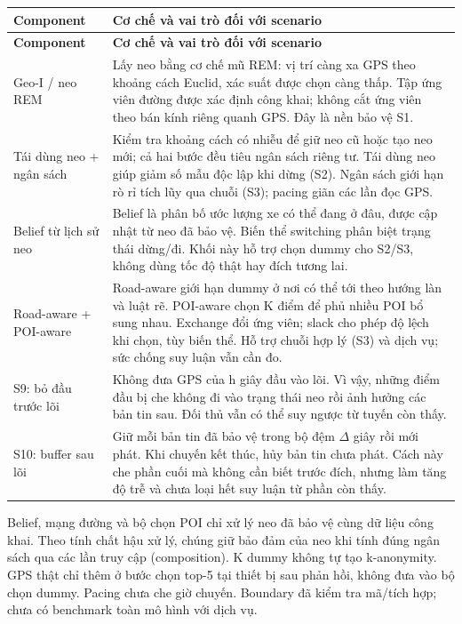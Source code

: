 \documentclass[10pt,a4paper]{article}
\begin{document}
\begingroup\small
\begin{longtable}{@{}P{4.105cm}P{12.814cm}@{}}
\toprule
\textbf{Component} & \textbf{Cơ chế và vai trò đối với scenario}\\\midrule
\endfirsthead
\toprule
\textbf{Component} & \textbf{Cơ chế và vai trò đối với scenario}\\\midrule
\endhead
\bottomrule\endfoot
Geo-I / neo REM & Lấy neo bằng cơ chế mũ REM: vị trí càng xa GPS theo khoảng cách Euclid, xác suất được chọn càng thấp. Tập ứng viên đường được xác định công khai; không cắt ứng viên theo bán kính riêng quanh GPS. Đây là nền bảo vệ S1.\\
\addlinespace[3pt]
Tái dùng neo + ngân sách & Kiểm tra khoảng cách có nhiễu để giữ neo cũ hoặc tạo neo mới; cả hai bước đều tiêu ngân sách riêng tư. Tái dùng neo giúp giảm số mẫu độc lập khi dừng (S2). Ngân sách giới hạn rò rỉ tích lũy qua chuỗi (S3); pacing giãn các lần đọc GPS.\\
\addlinespace[3pt]
Belief từ lịch sử neo & Belief là phân bố ước lượng xe có thể đang ở đâu, được cập nhật từ neo đã bảo vệ. Biến thể switching phân biệt trạng thái dừng/đi. Khối này hỗ trợ chọn dummy cho S2/S3, không dùng tốc độ thật hay đích tương lai.\\
\addlinespace[3pt]
Road-aware + POI-aware & Road-aware giới hạn dummy ở nơi có thể tới theo hướng làn và luật rẽ. POI-aware chọn K điểm để phủ nhiều POI bổ sung nhau. Exchange đổi ứng viên; slack cho phép độ lệch khi chọn, tùy biến thể. Hỗ trợ chuỗi hợp lý (S3) và dịch vụ; sức chống suy luận vẫn cần đo.\\
\addlinespace[3pt]
S9: bỏ đầu trước lõi & Không đưa GPS của h giây đầu vào lõi. Vì vậy, những điểm đầu bị che không đi vào trạng thái neo rồi ảnh hưởng các bản tin sau. Đối thủ vẫn có thể suy ngược từ tuyến còn thấy.\\
\addlinespace[3pt]
S10: buffer sau lõi & Giữ mỗi bản tin đã bảo vệ trong bộ đệm $\Delta$ giây rồi mới phát. Khi chuyến kết thúc, hủy bản tin chưa phát. Cách này che phần cuối mà không cần biết trước đích, nhưng làm tăng độ trễ và chưa loại hết suy luận từ phần còn thấy.\\
\end{longtable}
\endgroup
Belief, mạng đường và bộ chọn POI chỉ xử lý neo đã bảo vệ cùng dữ liệu công khai. Theo tính chất hậu xử lý, chúng giữ bảo đảm của neo khi tính đúng ngân sách qua các lần truy cập (composition). K dummy không tự tạo k-anonymity. GPS thật chỉ thêm ở bước chọn top-5 tại thiết bị sau phản hồi, không đưa vào bộ chọn dummy. Pacing chưa che giờ chuyến. Boundary đã kiểm tra mã/tích hợp; chưa có benchmark toàn mô hình với dịch vụ.
\end{document}
